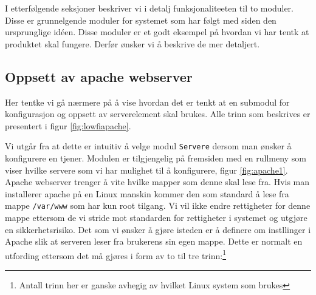 I etterfølgende seksjoner beskriver vi i detalj funksjonaliteeten til to moduler. Disse er grunnelgende moduler for systemet som har følgt med siden den ursprunglige idéen. Disse moduler er et godt eksempel på hvordan vi har tentk at produktet skal fungere. Derfør ønsker vi å beskrive de mer detaljert.

\subsection{Oppsett av apache webserver}
Her tentke vi gå nærmere på å vise hvordan det er tenkt at en submodul for konfigurasjon og oppsett av serverelement skal brukes. Alle trinn som beskrives er presentert i figur \ref{fig:lowfiapache}.

Vi utgår fra at dette er intuitiv å velge modul \texttt{Servere} dersom man ønsker å konfigurere en tjener. Modulen er tilgjengelig på fremsiden med en rullmeny som viser hvilke servere som vi har mulighet til å konfigurere, figur \ref{fig:apache1}. 
Apache webserver trenger å vite hvilke mapper som denne skal lese fra. Hvis man installerer apache på en Linux manskin kommer den som standard å lese fra mappe \texttt{/var/www} som har kun root tilgang. Vi vil ikke endre rettigheter for denne mappe ettersom de vi stride mot standarden for rettigheter i systemet og utgjøre en sikkerhetsrisiko.\cite{book:unixprog}
Det som vi ønsker å gjøre isteden er å definere om instllinger i Apache slik at serveren leser fra brukerens sin egen mappe. Dette er normalt en utfording ettersom det må gjøres i form av to til tre trinn:\footnote{Antall trinn her er ganske avhegig av hvilket Linux system som brukes}

